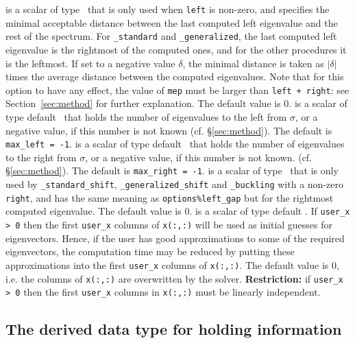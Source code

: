 \documentclass{spral}
\begin{document}
\begin{description}
%
is a scalar of type \REALDP\ 
that is only used when
{\tt left} is non-zero, and
specifies the minimal acceptable distance
between the last computed left eigenvalue
and the rest of the spectrum.
For {\tt \solver\_standard} and {\tt \solver\_generalized},
the last computed left eigenvalue
is the rightmost of the computed ones,
and for the other procedures
it is the leftmost.
If set to a negative value $\delta$,
the minimal distance is taken as
$|\delta|$ times the average distance between the computed eigenvalues.
Note that for this option to have any effect,
the value of {\tt mep} must be larger than
{\tt left + right}: see Section~\ref{sec:method}
for further explanation.
The default value is 0.
%
is a scalar of type default \Integer\ that
holds the number of eigenvalues to the left from $\sigma$,
or a negative value, if this number is not known
(cf. \S\ref{sec:method}).
The default is {\tt max\_left = -1}.
%
is a scalar of type default \Integer\ that
holds the number of eigenvalues to the right from $\sigma$,
or a negative value, if this number is not known.
(cf. \S\ref{sec:method}).
The default is {\tt max\_right = -1}.
%
is a scalar of type \REALDP\ 
that is only used by 
{\tt \solver\_standard\_shift}, {\tt \solver\_generalized\_shift}
and {\tt \solver\_buckling}
with a non-zero {\tt right}, and
has the same meaning as {\tt options\%left\_gap}
but for the rightmost computed eigenvalue.
The default value is 0.
%
 is a scalar of type default \Integer. 
If {\tt user\_x > 0} then the first {\tt user\_x} columns
of {\tt x(:,:)} will be used as initial guesses for eigenvectors.
Hence, if the user has good approximations
to some of the required eigenvectors, the computation time
may be reduced by putting these approximations
into the first {\tt user\_x} columns of {\tt x(:,:)}.
The default value is 0, 
i.e. the columns of {\tt x(:,:)} are overwritten by the solver.
{\bf Restriction:} if {\tt user\_x > 0} then
the first {\tt user\_x} columns in {\tt x(:,:)}
must be linearly independent.
%
\end{description}

\subsection{The derived data type for holding information}

\label{sec:inform}
\end{document}
